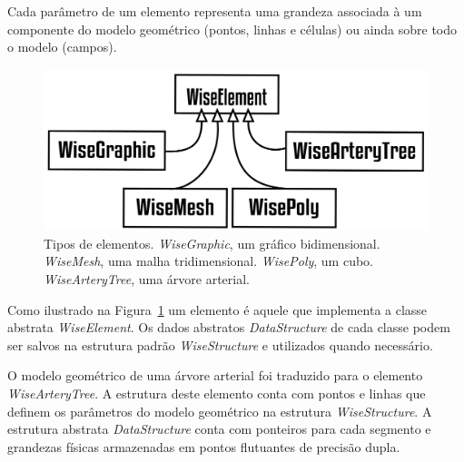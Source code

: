 Cada parâmetro de um elemento representa uma grandeza associada à um componente do modelo geométrico (pontos,  linhas e células) ou ainda sobre todo o modelo (campos). 

\begin{figure}[!htbp]
	\centering
	\includegraphics[width=\textwidth]{Figures/WiseElements@16x.png}
	\caption{Tipos de elementos. \textit{WiseGraphic}, um gráfico bidimensional. \textit{WiseMesh}, uma malha tridimensional. \textit{WisePoly}, um cubo. \textit{WiseArteryTree}, uma árvore arterial.}
	\label{fig2:wiselements}
\end{figure}

Como ilustrado na Figura~\ref{fig2:wiselements} um elemento é aquele que implementa a classe abstrata \textit{WiseElement}. Os dados abstratos \textit{DataStructure} de cada classe podem ser salvos na estrutura padrão \textit{WiseStructure} e utilizados quando necessário. 

O modelo geométrico de uma árvore arterial foi traduzido para o elemento \textit{WiseArteryTree}. A estrutura deste elemento conta com pontos e linhas que definem os parâmetros do modelo geométrico na estrutura \textit{WiseStructure}. A estrutura abstrata \textit{DataStructure} conta com ponteiros para cada segmento e grandezas físicas armazenadas em pontos flutuantes de precisão dupla.

